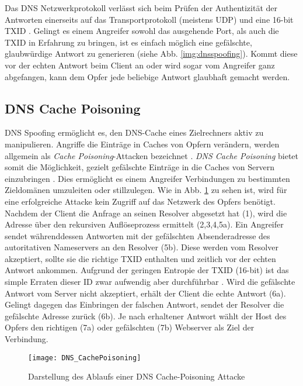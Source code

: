 Das DNS Netzwerkprotokoll verlässt sich beim Prüfen der Authentizität der Antworten einerseits auf das Transportprotokoll (meistens UDP) und eine 16-bit \ac{TXID} \cite{rfc1035}. Gelingt es einem Angreifer sowohl das ausgehende Port, als auch die \ac{TXID} in Erfahrung zu bringen, ist es einfach möglich eine gefälschte, glaubwürdige Antwort zu generieren (siehe Abb. \ref{img:dnsspoofing}). Kommt diese vor der echten Antwort beim Client an oder wird sogar vom Angreifer ganz abgefangen, kann dem Opfer jede beliebige Antwort glaubhaft gemacht werden.

\subsection{DNS Cache Poisoning}
DNS Spoofing ermöglicht es, den DNS-Cache eines Zielrechners aktiv zu manipulieren. Angriffe die Einträge in Caches von Opfern verändern, werden allgemein als \textit{Cache Poisoning}-Attacken bezeichnet \cite{CAPEC141}. \textit{DNS Cache Poisoning} bietet somit die Möglichkeit, gezielt gefälschte Einträge in die Caches von Servern einzubringen \cite{CAPEC142}. Dies ermöglicht es einem Angreifer Verbindungen zu bestimmten Zieldomänen umzuleiten oder stillzulegen. Wie in Abb. \ref{img:dnscachepoisoning} zu sehen ist, wird für eine erfolgreiche Attacke kein Zugriff auf das Netzwerk des Opfers benötigt. Nachdem der Client die Anfrage an seinen Resolver abgesetzt hat (1), wird die Adresse über den rekursiven Auflöseprozess ermittelt (2,3,4,5a). Ein Angreifer sendet währenddessen Antworten mit der gefälschten Absenderadresse des autoritativen Nameservers an den Resolver (5b). Diese werden vom Resolver akzeptiert, sollte sie die richtige \ac{TXID} enthalten und zeitlich vor der echten Antwort ankommen. Aufgrund der geringen Entropie der \ac{TXID} (16-bit) ist das simple Erraten dieser ID zwar aufwendig aber durchführbar \cite{Son2010}. Wird die gefälschte Antwort vom Server nicht akzeptiert, erhält der Client die echte Antwort (6a). Gelingt dagegen das Einbringen der falschen Antwort, sendet der Resolver die gefälschte Adresse zurück (6b). Je nach erhaltener Antwort wählt der Host des Opfers den richtigen (7a) oder gefälschten (7b) Webserver als Ziel der Verbindung.    

\begin{figure}[htbp]
    \centering
    \texttt{[image: DNS\_CachePoisoning]}
    \caption{Darstellung des Ablaufs einer DNS Cache-Poisoning Attacke}
    \label{img:dnscachepoisoning}
\end{figure}

